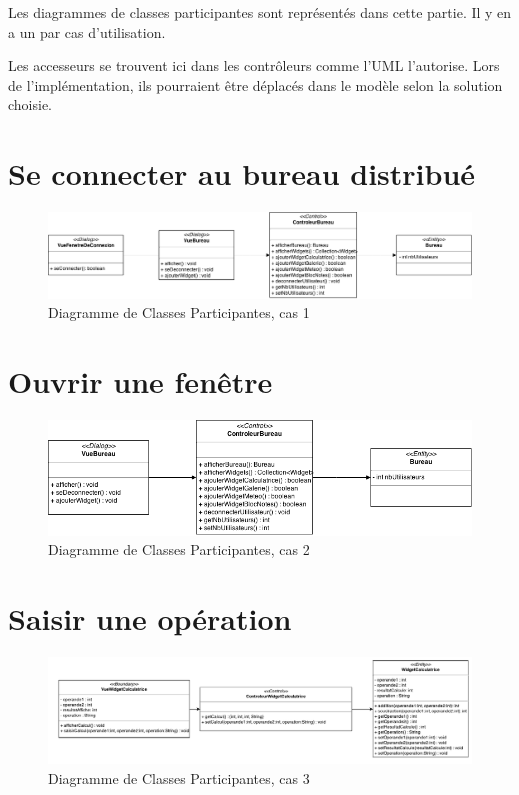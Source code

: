 Les diagrammes de classes participantes sont représentés dans cette 
partie. Il y en a un par cas d'utilisation.

Les accesseurs se trouvent ici dans les contrôleurs comme l'UML l'autorise. Lors de l'implémentation, ils pourraient être déplacés dans le modèle selon la solution choisie.

\section{Se connecter au bureau distribué}

\noindent\begin{figure}[H]
	\centering
	\includegraphics[angle=90,scale=0.5]{diagrammes/DCP1.png}
	\caption{Diagramme de Classes Participantes, cas 1}
\end{figure}

\section{Ouvrir une fenêtre}

\begin{figure}[H]
	\centering
	\includegraphics[scale=0.4]{diagrammes/DCP2.png}
	\caption{Diagramme de Classes Participantes, cas 2}
\end{figure}

\section{Saisir une opération}
\noindent\begin{figure}[H]
	\centering
	\includegraphics[angle=90,scale=0.9]{diagrammes/DCP3.pdf}
	\caption{Diagramme de Classes Participantes, cas 3}
\end{figure}

